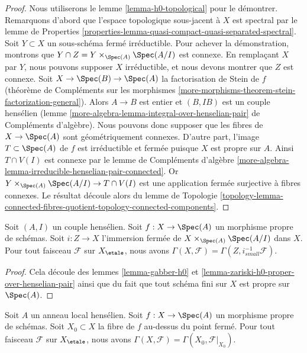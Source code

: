 \begin{proof}
Nous utiliserons le lemme \ref{lemma-h0-topological} pour le démontrer. Remarquons d'abord
que l'espace topologique sous-jacent à $X$ est spectral par le lemme de Properties
\ref{properties-lemma-quasi-compact-quasi-separated-spectral}.
Soit $Y \subset X$ un sous-schéma fermé irréductible. Pour achever la démonstration,
montrons que $Y \cap Z = Y \times_{\Spec(A)} \Spec(A/I)$ est connexe.
En remplaçant $X$ par $Y$,
nous pouvons supposer $X$ irréductible, et nous devons montrer que $Z$
est connexe. Soit $X \to \Spec(B) \to \Spec(A)$ la factorisation de Stein
de $f$ (théorème de Compléments sur les morphismes
\ref{more-morphisms-theorem-stein-factorization-general}).
Alors $A \to B$ est entier et $(B, IB)$ est un couple hensélien
(lemme \ref{more-algebra-lemma-integral-over-henselian-pair} de Compléments d'algèbre).
Nous pouvons donc supposer que les fibres de $X \to \Spec(A)$ sont géométriquement
connexes. D'autre part, l'image $T \subset \Spec(A)$ de $f$
est irréductible et fermée puisque $X$ est propre sur $A$. Ainsi $T \cap V(I)$
est connexe par le lemme de Compléments d'algèbre
\ref{more-algebra-lemma-irreducible-henselian-pair-connected}.
Or $Y \times_{\Spec(A)} \Spec(A/I) \to T \cap V(I)$
est une application fermée surjective à fibres connexes.
Le résultat découle alors du lemme de Topologie
\ref{topology-lemma-connected-fibres-quotient-topology-connected-components}.
\end{proof}

\begin{lemma}
\label{lemma-h0-proper-over-henselian-pair}
Soit $(A, I)$ un couple hensélien. Soit $f : X \to \Spec(A)$ un morphisme propre
de schémas. Soit $i : Z \to X$ l'immersion fermée de
$X \times_{\Spec(A)} \Spec(A/I)$ dans $X$. Pour tout
faisceau $\mathcal{F}$ sur $X_\etale$, nous
avons $\Gamma(X, \mathcal{F}) = \Gamma(Z, i_{small}^{-1}\mathcal{F})$.
\end{lemma}

\begin{proof}
Cela découle des lemmes \ref{lemma-gabber-h0} et
\ref{lemma-zariski-h0-proper-over-henselian-pair}
ainsi que du fait que tout schéma fini sur $X$ est propre sur $\Spec(A)$.
\end{proof}

\begin{lemma}
\label{lemma-h0-proper-over-henselian-local}
Soit $A$ un anneau local hensélien. Soit $f : X \to \Spec(A)$
un morphisme propre de schémas. Soit $X_0 \subset X$ la fibre de
$f$ au-dessus du point fermé. Pour tout faisceau $\mathcal{F}$ sur $X_\etale$, nous
avons $\Gamma(X, \mathcal{F}) = \Gamma(X_0, \mathcal{F}|_{X_0})$.
\end{lemma}

